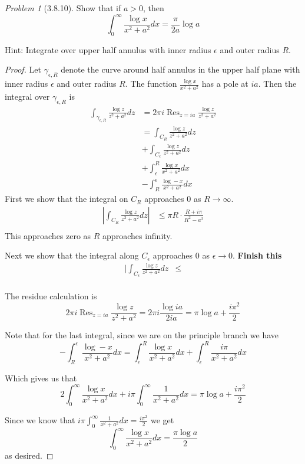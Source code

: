 \documentclass[10pt]{article}
\newcommand{\sk}{\vskip 10mm}
\DeclareMathOperator{\Res}{Res}
\theoremstyle{remark}
\newtheorem{problem}{Problem}
\theoremstyle{remark}
\begin{document}
\sk

\begin{problem}[3.8.10]
  Show that if $a>0$, then
  \[
    \int_0^\infty\frac{\log x}{x^2+a^2}dx=\frac{\pi}{2a}\log a
  \]

  Hint: Integrate over upper half annulus with inner radius $\epsilon$ and outer
  radius $R$.
\end{problem}

\begin{proof}
  Let $\gamma_{\epsilon,R}$ denote the curve around half annulus in the upper half plane with
  inner radius $\epsilon$ and outer radius $R$. The function $\frac{\log x}{x^2+a^2}$ has
  a pole at $ia$. Then the integral over $\gamma_{\epsilon,R}$ is
  \begin{align*}
    \int_{\gamma_{\epsilon,R}}\frac{\log z}{z^2+a^2} dz&= 2\pi i\Res_{z=ia}\frac{\log z}{z^2+a^2}\\
                                                    &= \int_{C_R}\frac{\log z}{z^2+a^2}dz \\
                                                    &+ \int_{C_\epsilon}\frac{\log z}{z^2+a^2}dz \\
                                                    &+ \int_\epsilon^R \frac{\log x}{x^2+a^2}dx\\
                                                    &-\int_{R}^{\epsilon}\frac{\log -x}{x^2+a^2}dx
  \end{align*}
  First we show that the integral on $C_R$ approaches $0$ as $R\rightarrow\infty$.
  \begin{align*}
    |\int_{C_R}\frac{\log z}{z^2+a^2}dz| &\leq \pi R\cdot \frac{R+i\pi}{R^2-a^2}\\
  \end{align*}
  This approaches zero as $R$ approaches infinity.

  Next we show that the integral along $C_\epsilon$ approaches $0$ as $\epsilon\rightarrow 0$.
  \textbf{Finish this}
  \begin{align*}
    |\int_{C_\epsilon}\frac{\log z}{z^2+a^2}dz & \leq \\
  \end{align*}
  
  The residue calculation is
  \[
    2\pi i\Res_{z=ia}\frac{\log z}{z^2+a^2}= 2\pi i\frac{\log ia}{2ia} = \pi\log a+\frac{i\pi^2}{2}
  \]

  Note that for the last integral, since we are on the principle branch we have
  \[
    -\int_{R}^{\epsilon}\frac{\log -x}{x^2+a^2}dx =\int_\epsilon^R\frac{\log x}{x^2+a^2}dx+\int_\epsilon^R\frac{i\pi}{x^2+a^2}dx
  \]
  
  Which gives us that
  \[
    2\int_0^\infty\frac{\log x}{x^2+a^2}dx+i\pi\int_0^\infty\frac{1}{x^2+a^2}dx = \pi\log a+\frac{i\pi^2}{2}
  \]

  Since we know that $i\pi\int_0^\infty\frac{1}{x^2+a^2}dx = \frac{i\pi^2}{2}$ we get
  \[
    \int_0^\infty\frac{\log x}{x^2+a^2}dx=\frac{\pi\log a}{2}
  \]
  as desired.
\end{proof}
\end{document}
